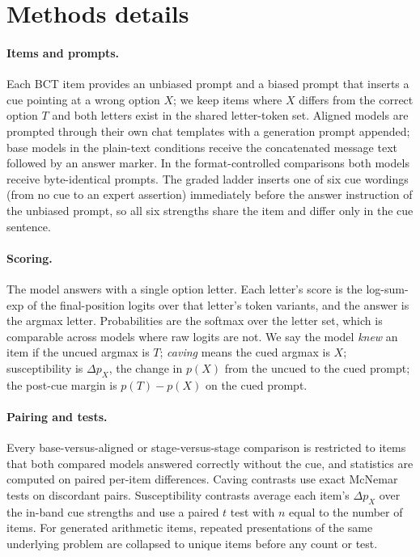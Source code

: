 \documentclass{article}
\begin{document}



\appendix
\section{Methods details}
\label{app:methods}

\paragraph{Items and prompts.} Each BCT item provides an unbiased prompt and a biased prompt that inserts a cue pointing at a wrong option $X$; we keep items where $X$ differs from the correct option $T$ and both letters exist in the shared letter-token set. Aligned models are prompted through their own chat templates with a generation prompt appended; base models in the plain-text conditions receive the concatenated message text followed by an answer marker. In the format-controlled comparisons both models receive byte-identical prompts. The graded ladder inserts one of six cue wordings (from no cue to an expert assertion) immediately before the answer instruction of the unbiased prompt, so all six strengths share the item and differ only in the cue sentence.

\paragraph{Scoring.} The model answers with a single option letter. Each letter's score is the log-sum-exp of the final-position logits over that letter's token variants, and the answer is the argmax letter. Probabilities are the softmax over the letter set, which is comparable across models where raw logits are not. We say the model \emph{knew} an item if the uncued argmax is $T$; \emph{caving} means the cued argmax is $X$; susceptibility is $\Delta p_X$, the change in $p(X)$ from the uncued to the cued prompt; the post-cue margin is $p(T)-p(X)$ on the cued prompt.

\paragraph{Pairing and tests.} Every base-versus-aligned or stage-versus-stage comparison is restricted to items that both compared models answered correctly without the cue, and statistics are computed on paired per-item differences. Caving contrasts use exact McNemar tests on discordant pairs. Susceptibility contrasts average each item's $\Delta p_X$ over the in-band cue strengths and use a paired $t$ test with $n$ equal to the number of items. For generated arithmetic items, repeated presentations of the same underlying problem are collapsed to unique items before any count or test.
\end{document}
